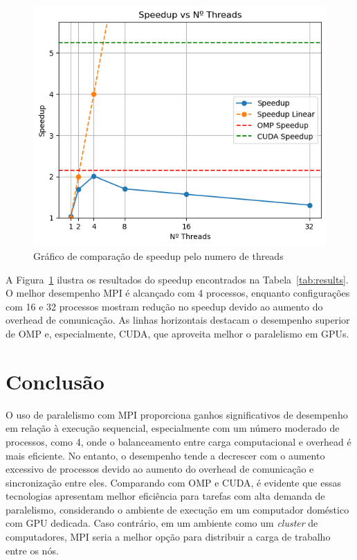 \documentclass[12pt]{article}
\begin{document}
\begin{figure}[H]
  \centering
  \includegraphics[width=.5\textwidth]{figs/speedupxthreads_MPI.png}
  \caption{Gráfico de comparação de speedup pelo numero de threads}
  \label{fig:speedupxthreads}
\end{figure}

A Figura~\ref{fig:speedupxthreads} ilustra os resultados do speedup encontrados
na Tabela~\ref{tab:results}. O melhor desempenho MPI é alcançado com 4
processos, enquanto configurações com 16 e 32 processos mostram redução no
speedup devido ao aumento do overhead de comunicação. As linhas horizontais
destacam o desempenho superior de OMP e, especialmente, CUDA, que aproveita
melhor o paralelismo em GPUs.

\section{Conclusão}
O uso de paralelismo com MPI proporciona ganhos significativos de desempenho em
relação à execução sequencial, especialmente com um número moderado de
processos, como 4, onde o balanceamento entre carga computacional e overhead é
mais eficiente. No entanto, o desempenho tende a decrescer com o aumento
excessivo de processos devido ao aumento do overhead de comunicação e
sincronização entre eles. Comparando com OMP e CUDA, é evidente que essas
tecnologias apresentam melhor eficiência para tarefas com alta demanda de
paralelismo, considerando o ambiente de execução em um computador doméstico com
GPU dedicada. Caso contrário, em um ambiente como um \textit{cluster} de
computadores, MPI seria a melhor opção para distribuir a carga de trabalho
entre os nós.



\nocite{*}
\end{document}
